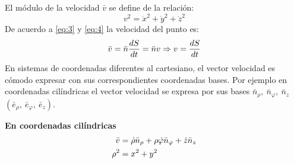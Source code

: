 \documentclass[11pt]{article}
\begin{document}
El módulo de la velocidad $\bar{v} $ se define de la relación:
\begin{equation*}
v^2 = \dot{x}^2 + \dot{y}^2 + \dot{z}^2 
\end{equation*}De acuerdo  a \eqref{eq:3} y \eqref{eq:4} la velocidad del punto es:
\begin{align}
\bar{v} = \bar{n} \dfrac{dS}{dt} = \bar{n}v \Rightarrow v = \dfrac{dS}{dt} \notag
\end{align}
En sistemas de coordenadas diferentes al cartesiano, el vector velocidad es cómodo expresar con sus correspondientes coordenadas bases.
Por ejemplo en coordenadas cilíndricas el vector velocidad se expresa por sus bases $\bar{n}_\rho,\ \bar{n}_\varphi,\ \bar{n}_z$ $(\bar{e}_\rho,\ \bar{e}_\varphi,\ \bar{e}_z)$.

\vspace{1.5cm}

\begin{minipage}{\textwidth}
\begin{wrapfigure}{l}{0.45\textwidth}
\centering
{}
\end{wrapfigure}
\textbf{En coordenadas cilíndricas}
\begin{align}
	\bar{v} &= \dot{\rho} \bar{n}_\rho + \rho \dot{\varphi}\bar{n}_\varphi + \dot{z}\bar{n}_z \notag \\
    \rho^2 &= x^2 + y^2 \notag
\end{align}
\end{minipage}
\end{document}
